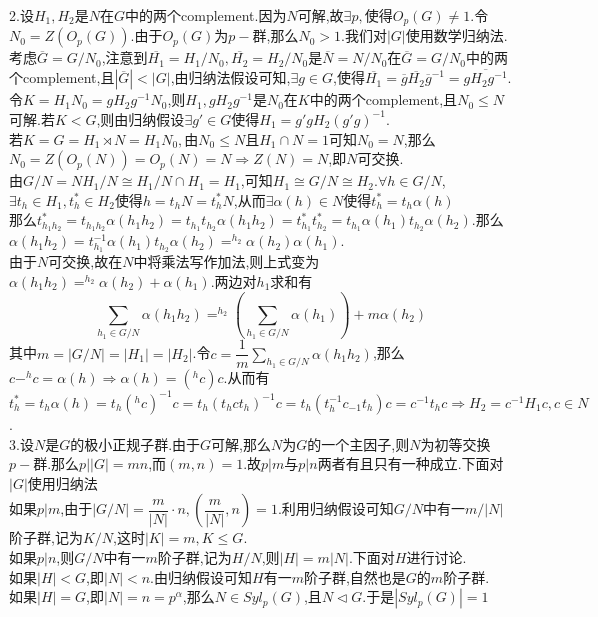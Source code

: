 \documentclass[b5paper,twoside]{ctexart}
\begin{document}
2.设$H_1,H_2$是$N$在$G$中的两个complement.因为$N$可解,故$\exists p,$使得$O_p(G)\neq 1.$令$N_0=Z(O_p(G))$.由于$O_p(G)$为$p-$群,那么$N_0>1$.我们对$|G|$使用数学归纳法.考虑$\overline{G}=G/N_0$,注意到$\overline{H_1}=H_1/N_0,\overline{H_2}=H_2/N_0$是$\overline{N}=N/N_0$在$\overline{G}=G/N_0$中的两个complement,且$|\overline{G}|<|G|$,由归纳法假设可知,$\exists g\in G$,使得$\overline{H_1}=\overline{g}\overline{H_2}\overline{g}^{-1}=\overline{gH_2g^{-1}}$.\\
令$K=H_1N_0=gH_2g^{-1}N_0$,则$H_1,gH_2g^{-1}$是$N_0$在$K$中的两个complement,且$N_0\leq N$可解.若$K<G$,则由归纳假设$\exists g'\in G$使得$H_1=g'gH_2(g'g)^{-1}$.\\
若$K=G=H_1\rtimes N=H_1N_0,$由$N_0\leq N$且$H_1\cap N=1$可知$N_0=N$,那么$N_0=Z(O_p(N))=O_p(N)=N\Rightarrow Z(N)=N$,即$N$可交换.\\
由$G/N=NH_1/N\cong H_1/N\cap H_1=H_1$,可知$H_1\cong G/N\cong H_2$.$\forall h\in G/N$,$\exists t_h\in H_1,t_h^*\in H_2$使得$h=t_hN=t_h^*N$,从而$\exists \alpha(h)\in N$使得$t_h^*=t_h\alpha(h)$\\
那么$t^*_{h_1h_2}=t_{h_1h_2}\alpha(h_1h_2)=t_{h_1}t_{h_2}\alpha(h_1h_2)=t_{h_1}^*t_{h_2}^*=t_{h_1}\alpha(h_1)t_{h_2}\alpha(h_2)$.那么$\alpha(h_1h_2)=t_{h_1}^{-1}\alpha(h_1)t_{h_2}\alpha(h_2)=^{h_2}\alpha(h_2)\alpha(h_1)$.\\
由于$N$可交换,故在$N$中将乘法写作加法,则上式变为$\alpha(h_1h_2)=^{h_2}\alpha(h_2)+\alpha(h_1)$.两边对$h_1$求和有
\[\sum_{h_1\in G/N}\alpha(h_1h_2)=^{h_2}\left(\sum_{h_1\in G/N}\alpha(h_1)\right)+m\alpha(h_2)\]
其中$m=|G/N|=|H_1|=|H_2|$.令$c=\dfrac{1}{m}\sum_{h_1\in G/N}\alpha(h_1h_2)$,那么$c-^{h}c=\alpha(h)\Rightarrow \alpha(h)=(^hc)c$.从而有$t^*_h=t_h\alpha(h)=t_h(^hc)^{-1}c=t_h(t_hct_h)^{-1}c=t_h(t_h^{-1}c_{-1}t_h)c=c^{-1}t_hc\Rightarrow H_2=c^{-1}H_1c,c\in N$.\\
3.设$N$是$G$的极小正规子群.由于$G$可解,那么$N$为$G$的一个主因子,则$N$为初等交换$p-$群.那么$p||G|=mn$,而$(m,n)=1$.故$p|m$与$p|n$两者有且只有一种成立.下面对$|G|$使用归纳法\\
如果$p|m$,由于$|G/N|=\dfrac{m}{|N|}\cdot n,(\dfrac{m}{|N|},n)=1$.利用归纳假设可知$G/N$中有一$m/|N|$阶子群,记为$K/N$,这时$|K|=m,K\leq G$.\\
如果$p|n$,则$G/N$中有一$m$阶子群,记为$H/N$,则$|H|=m|N|$.下面对$H$进行讨论.\\
如果$|H|<G$,即$|N|<n$.由归纳假设可知$H$有一$m$阶子群,自然也是$G$的$m$阶子群.\\
如果$|H|=G$,即$|N|=n=p^\alpha$,那么$N\in Syl_p(G)$,且$N\lhd G$.于是$|Syl_p(G)|=1$\\
\end{document}
